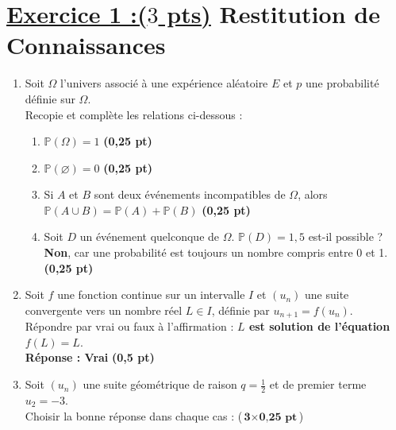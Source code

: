 \documentclass[12pt,a4paper]{article}
\begin{document}
\section*{\underline{Exercice 1 :($3$ pts)} Restitution de Connaissances}
\begin{enumerate}
    \item Soit \( \Omega \) l’univers associé à une expérience aléatoire \( E \) et \( p \) une probabilité définie sur \( \Omega \).\\
          Recopie et complète les relations ci-dessous :
          \begin{enumerate}
              \item \( \mathbb{P}(\Omega) = 1 \) \hfill \textbf{(0,25 pt)}
              \item \( \mathbb{P}(\varnothing) = 0 \) \hfill \textbf{(0,25 pt)}
              \item Si \( A \) et \( B \) sont deux événements incompatibles de \( \Omega \), alors \( \mathbb{P}(A \cup B) = \mathbb{P}(A) + \mathbb{P}(B) \) \hfill \textbf{(0,25 pt)}
              \item Soit \( D \) un événement quelconque de \( \Omega \). \( \mathbb{P}(D) = 1{,}5 \) est-il possible ?\\
                    \textbf{Non}, car une probabilité est toujours un nombre compris entre 0 et 1. \hfill \textbf{(0,25 pt)}
          \end{enumerate}

    \item Soit \( f \) une fonction continue sur un intervalle \( I \) et \( (u_n) \) une suite convergente vers un nombre réel \( L \in I \), définie par \( u_{n+1} = f(u_n) \).\\
          Répondre par vrai ou faux à l’affirmation : \textbf{\( L \) est solution de l’équation \( f(L) = L \)}. \\
          \textbf{Réponse : Vrai} \hfill \textbf{(0,5 pt)}

    \item Soit \( (u_n) \) une suite géométrique de raison \( q = \frac{1}{2} \) et de premier terme \( u_2 = -3 \).\\
          Choisir la bonne réponse dans chaque cas : \hfill (\( \textbf{3} \times \textbf{0,25 pt} \))


\end{enumerate}
\end{document}
